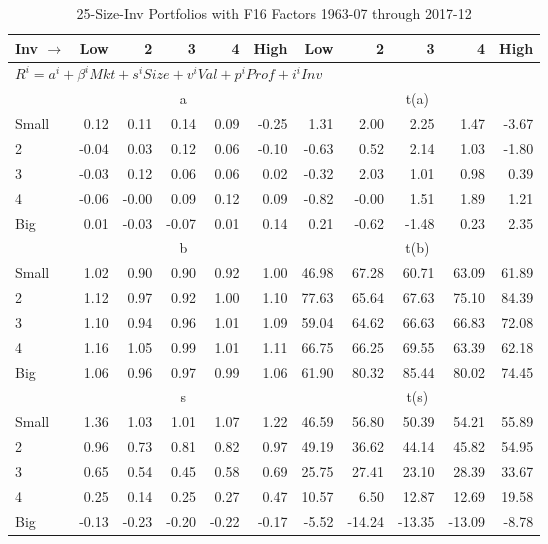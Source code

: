 
\begin{table}[!ht]
\footnotesize
\centering
\caption{25-Size-Inv Portfolios with F16 Factors 1963-07 through 2017-12}
\begin{tabular}{lrrrrrrrrrr}
  \toprule
    
    Inv $\rightarrow$ & Low & 2 & 3 & 4 & High & Low & 2 & 3 & 4 & High  \\ 
  \midrule
  \multicolumn{11}{l}{$R^i=a^i+\beta^iMkt+s^iSize+v^iVal+p^iProf+i^iInv$}  \\
  
     & \multicolumn{5}{c}{a} & \multicolumn{5}{c}{t(a)}   \\
     \cmidrule(r){2-6} \cmidrule(r){7-11} 
    Small  & 0.12  & 0.11  & 0.14  & 0.09  & -0.25  & 1.31  & 2.00  & 2.25  & 1.47  & -3.67   \\
    2  & -0.04  & 0.03  & 0.12  & 0.06  & -0.10  & -0.63  & 0.52  & 2.14  & 1.03  & -1.80   \\
    3  & -0.03  & 0.12  & 0.06  & 0.06  & 0.02  & -0.32  & 2.03  & 1.01  & 0.98  & 0.39   \\
    4  & -0.06  & -0.00  & 0.09  & 0.12  & 0.09  & -0.82  & -0.00  & 1.51  & 1.89  & 1.21   \\
    Big  & 0.01  & -0.03  & -0.07  & 0.01  & 0.14  & 0.21  & -0.62  & -1.48  & 0.23  & 2.35   \\
    
  
     & \multicolumn{5}{c}{b} & \multicolumn{5}{c}{t(b)}   \\
     \cmidrule(r){2-6} \cmidrule(r){7-11} 
    Small  & 1.02  & 0.90  & 0.90  & 0.92  & 1.00  & 46.98  & 67.28  & 60.71  & 63.09  & 61.89   \\
    2  & 1.12  & 0.97  & 0.92  & 1.00  & 1.10  & 77.63  & 65.64  & 67.63  & 75.10  & 84.39   \\
    3  & 1.10  & 0.94  & 0.96  & 1.01  & 1.09  & 59.04  & 64.62  & 66.63  & 66.83  & 72.08   \\
    4  & 1.16  & 1.05  & 0.99  & 1.01  & 1.11  & 66.75  & 66.25  & 69.55  & 63.39  & 62.18   \\
    Big  & 1.06  & 0.96  & 0.97  & 0.99  & 1.06  & 61.90  & 80.32  & 85.44  & 80.02  & 74.45   \\
    
  
     & \multicolumn{5}{c}{s} & \multicolumn{5}{c}{t(s)}   \\
     \cmidrule(r){2-6} \cmidrule(r){7-11} 
    Small  & 1.36  & 1.03  & 1.01  & 1.07  & 1.22  & 46.59  & 56.80  & 50.39  & 54.21  & 55.89   \\
    2  & 0.96  & 0.73  & 0.81  & 0.82  & 0.97  & 49.19  & 36.62  & 44.14  & 45.82  & 54.95   \\
    3  & 0.65  & 0.54  & 0.45  & 0.58  & 0.69  & 25.75  & 27.41  & 23.10  & 28.39  & 33.67   \\
    4  & 0.25  & 0.14  & 0.25  & 0.27  & 0.47  & 10.57  & 6.50  & 12.87  & 12.69  & 19.58   \\
    Big  & -0.13  & -0.23  & -0.20  & -0.22  & -0.17  & -5.52  & -14.24  & -13.35  & -13.09  & -8.78   \\
    

\end{tabular}
\end{table}
